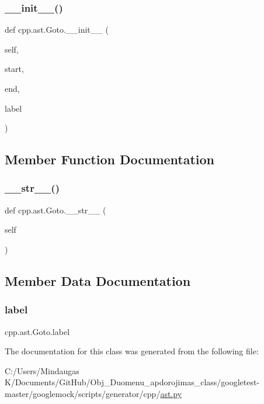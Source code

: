 \subsubsection{\texorpdfstring{\_\_init\_\_()}{\_\_init\_\_()}}
{\footnotesize\ttfamily def cpp.\+ast.\+Goto.\+\_\+\+\_\+init\+\_\+\+\_\+ (\begin{DoxyParamCaption}\item[{}]{self,  }\item[{}]{start,  }\item[{}]{end,  }\item[{}]{label }\end{DoxyParamCaption})}



\subsection{Member Function Documentation}
\mbox{\label{classcpp_1_1ast_1_1_goto_a508b6bc091cf06bfed73a33368c236c9}} 
\subsubsection{\texorpdfstring{\_\_str\_\_()}{\_\_str\_\_()}}
{\footnotesize\ttfamily def cpp.\+ast.\+Goto.\+\_\+\+\_\+str\+\_\+\+\_\+ (\begin{DoxyParamCaption}\item[{}]{self }\end{DoxyParamCaption})}



\subsection{Member Data Documentation}
\mbox{\label{classcpp_1_1ast_1_1_goto_a685284ea5f3b21f39aff7f5db841c8f5}} 
\subsubsection{\texorpdfstring{label}{label}}
{\footnotesize\ttfamily cpp.\+ast.\+Goto.\+label}



The documentation for this class was generated from the following file\+:\begin{DoxyCompactItemize}
\item 
C\+:/\+Users/\+Mindaugas K/\+Documents/\+Git\+Hub/\+Obj\+\_\+\+Duomenu\+\_\+apdorojimas\+\_\+class/googletest-\/master/googlemock/scripts/generator/cpp/\mbox{\hyperlink{googletest-master_2googlemock_2scripts_2generator_2cpp_2ast_8py}{ast.\+py}}\end{DoxyCompactItemize}
